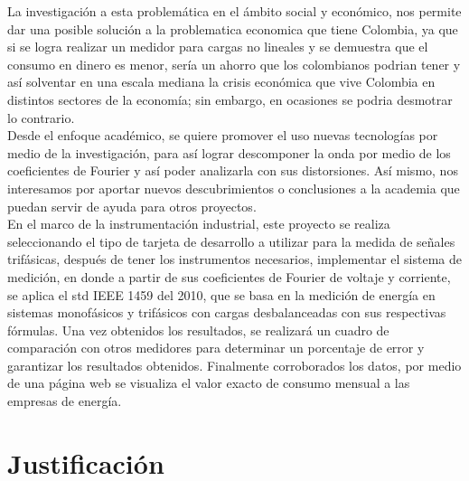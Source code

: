 La investigación a esta problemática en el ámbito social y económico, nos permite dar una posible solución a la problematica economica que tiene Colombia, ya que si se logra realizar un medidor para cargas no lineales y se demuestra que el consumo en dinero es menor, sería un ahorro que los colombianos podrian tener y así solventar en una escala mediana la crisis económica que vive Colombia en distintos sectores de la economía; sin embargo, en ocasiones se podria desmotrar lo contrario.\\

Desde el enfoque académico, se quiere promover el uso nuevas tecnologías por medio de la investigación, para así lograr descomponer la onda por medio de los coeficientes de Fourier y así poder analizarla con sus distorsiones. Así mismo, nos interesamos por aportar nuevos descubrimientos o conclusiones a la academia que puedan servir de ayuda para otros proyectos.\\

En el marco de la instrumentación industrial, este proyecto se realiza seleccionando el tipo de tarjeta de desarrollo a utilizar para la medida de señales trifásicas, después de tener los instrumentos necesarios, implementar el sistema de medición, en donde a partir de sus coeficientes de Fourier de voltaje y corriente, se aplica el std IEEE 1459 del 2010, que se basa en la medición de energía en sistemas monofásicos y trifásicos con cargas desbalanceadas con sus respectivas fórmulas. Una vez obtenidos los resultados, se realizará un cuadro de comparación con otros medidores para determinar un porcentaje de error y garantizar los resultados obtenidos. Finalmente corroborados los datos, por medio de una página web se visualiza el valor exacto de consumo mensual a las empresas de energía. \\



\newpage{\clearpage}
\chapter{ Justificación}


